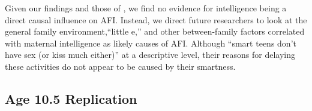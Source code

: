 \documentclass[a4paper,man,apacite,natbib,12pt,longtable]{apa6}\usepackage[]{graphicx}\usepackage[]{color}
\begin{document}
Given our findings and those of \citet{harden2011don}, we find no evidence for intelligence being a direct causal influence on AFI. Instead, we direct future researchers to look at the general family environment,``little e,'' and other between-family factors correlated with maternal intelligence as likely causes of AFI.  Although ``smart teens don't have sex (or kiss much either)'' \citep{halpern2000smart} at a descriptive level, their reasons for delaying these activities do not appear to be caused by their smartness.

\appendix\label{appen}
\begin{landscape} 
  \section{Age 10.5 Replication}\label{appen10}
  

\end{landscape}
\end{document}
